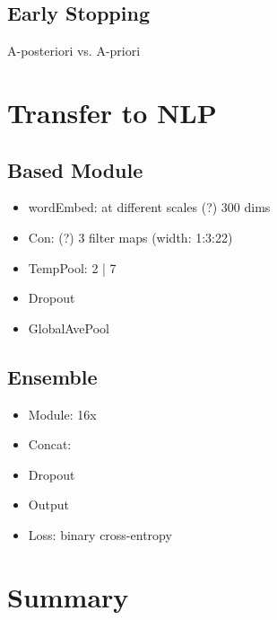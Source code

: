 \subsection{Early Stopping}
A-posteriori vs. A-priori

\section{Transfer to NLP}

\subsection{Based Module}
\begin{itemize}
	\item wordEmbed: at different scales (?) 300 dims
	\item Con: (?) 3 filter maps (width: 1:3:22)
	\item TempPool: 2 | 7
	\item Dropout
	\item GlobalAvePool
\end{itemize} 

\subsection{Ensemble}
\begin{itemize}
	\item Module: 16x
	\item Concat:
	\item Dropout
	\item Output
	\item Loss: binary cross-entropy
\end{itemize} 


\section{Summary}